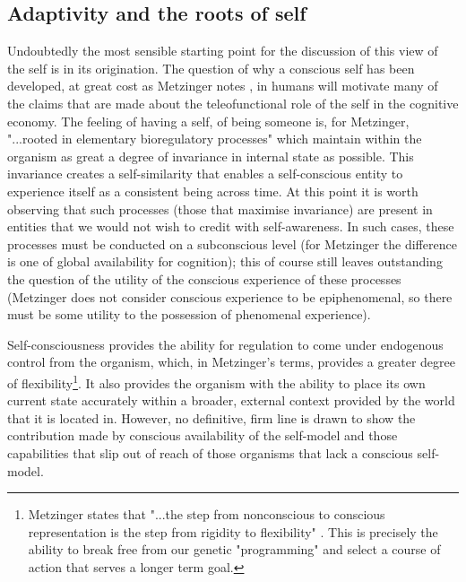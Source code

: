 \subsection{Adaptivity and the roots of self}
\label{metzinger_self_adaptivity}

Undoubtedly the most sensible starting point for the discussion of this view of the self is in its origination. The question of why a conscious self has been developed, at great cost as Metzinger notes \cite[p. 347]{metzinger2003}, in humans will motivate many of the claims that are made about the teleofunctional role of the self in the cognitive economy. The feeling of having a self, of being someone is, for Metzinger, "...rooted in elementary bioregulatory processes" \cite[p. 345]{metzinger2003} which maintain within the organism as great a degree of invariance in internal state as possible. This invariance creates a self-similarity that enables a self-conscious entity to experience itself as a consistent being across time. At this point it is worth observing that such processes (those that maximise invariance) are present in entities that we would not wish to credit with self-awareness. In such cases, these processes must be conducted on a subconscious level (for Metzinger the difference is one of global availability for cognition); this of course still leaves outstanding the question of the utility of the conscious experience of these processes (Metzinger does not consider conscious experience to be epiphenomenal, so there must be some utility to the possession of phenomenal experience).

Self-consciousness provides the ability for regulation to come under endogenous control from the organism, which, in Metzinger's terms, provides a greater degree of flexibility\footnote{Metzinger states that "...the step from nonconscious to conscious representation is the step from rigidity to flexibility" \cite[p. 348]{metzinger2003}. This is precisely the ability to break free from our genetic "programming" and select a course of action that serves a longer term goal.}. It also provides the organism with the ability to place its own current state accurately within a broader, external context provided by the world that it is located in. However, no definitive, firm line is drawn to show the contribution made by conscious availability of the self-model and those capabilities that slip out of reach of those organisms that lack a conscious self-model.

